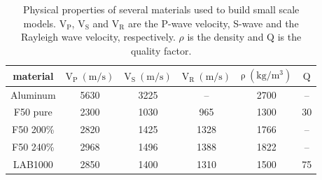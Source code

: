 \documentclass[paper,extra]{gji} %
\begin{document}
\begin{table}[!ht]
\centering
\begin{tabular}{cccccc}
\hline
material & $\mathrm{V_{P}\ (m/s)}$ & $\mathrm{V_{S}\ (m/s)}$ & $\mathrm{V_{R}\ (m/s)}$ & $\mathrm{\rho\ (kg/m^{3})}$ & $\mathrm{Q}$ \\
\hline
Aluminum & 5630 & 3225 & -- & 2700 & -- \\
F50 pure & 2300 & 1030 & 965 & 1300 & 30 \\
F50 200\% & 2820 & 1425 & 1328 & 1766 & -- \\
F50 240\% & 2968 & 1496 & 1388 & 1822 & -- \\
LAB1000 & 2850 & 1400 & 1310 & 1500 & 75 \\
\hline
\end{tabular}
\caption{Physical properties of several materials used to build small scale models. $\mathrm{V_{P}}$, $\mathrm{V_{S}}$ and $\mathrm{V_{R}}$ are the P-wave velocity, S-wave and the Rayleigh wave velocity, respectively. $\rho$ is the density and $\mathrm{Q}$ is the quality factor.}
\label{epoxy-resin}
\end{table}

% 

\end{document}
